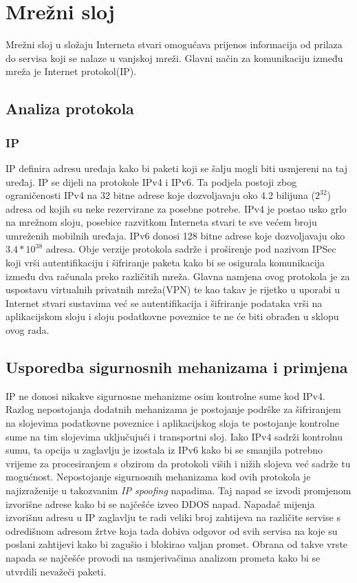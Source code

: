 \documentclass[times, utf8, diplomski]{fer}
\begin{document}
\section{Mrežni sloj}
Mrežni sloj u složaju Interneta stvari omogućava prijenos informacija od prilaza do servisa koji se nalaze u vanjskoj mreži. Glavni način za komunikaciju između mreža je Internet protokol(IP). 

\subsection{Analiza protokola}
\subsubsection{IP}
IP definira adresu uređaja kako bi paketi koji se šalju mogli biti usmjereni na taj uređaj. IP se dijeli na protokole IPv4 i IPv6. Ta podjela postoji zbog ograničenosti IPv4 na 32 bitne adrese koje dozvoljavaju oko 4.2 bilijuna ($2^{32}$) adresa od kojih su neke rezervirane za posebne potrebe. IPv4 je postao usko grlo na mrežnom sloju, posebice razvitkom Interneta stvari te sve većem broju umreženih mobilnih uređaja. IPv6 donosi 128 bitne adrese koje dozvoljavaju oko $3.4*10^{38}$ adresa. Obje verzije protokola sadrže i proširenje pod nazivom IPSec  koji vrši autentifikaciju i šifriranje paketa kako bi se osigurala komunikacija između dva računala preko različitih mreža. Glavna namjena ovog protokola je za uspostavu virtualnih privatnih mreža(VPN) te kao takav je rijetko u uporabi u Internet stvari sustavima već se autentifikacija i šifriranje podataka vrši na aplikacijskom sloju i sloju podatkovne poveznice te ne će biti obrađen u sklopu ovog rada. 

\subsection{Usporedba sigurnosnih mehanizama i primjena}
IP ne donosi nikakve sigurnosne mehanizme osim kontrolne sume kod IPv4. Razlog nepostojanja dodatnih mehanizama je postojanje podrške za šifriranjem na slojevima podatkovne poveznice i aplikacijskog sloja te postojanje kontrolne sume na tim slojevima uključujući i transportni sloj. Iako IPv4 sadrži kontrolnu sumu, ta opcija u zaglavlju je izostala iz IPv6 kako bi se smanjila potrebno vrijeme za procesiranjem s obzirom da protokoli viših i nižih slojeva već sadrže tu mogućnost. Nepostojanje sigurnosnih mehanizama kod ovih protokola je najizraženije u takozvanim \emph{IP spoofing} napadima. Taj napad se izvodi promjenom izvorišne adrese kako bi se najčešće izveo DDOS  napad. Napadač mijenja izvorišnu adresu u IP zaglavlju te radi veliki broj zahtijeva na različite servise s odredišnom adresom žrtve koja tada dobiva odgovor od svih servisa na koje su poslani zahtijevi kako bi zagušio i blokirao valjan promet. Obrana od takve vrste napada se najčešće provodi na usmjerivačima analizom prometa kako bi se utvrdili nevažeči paketi. 
\end{document}
